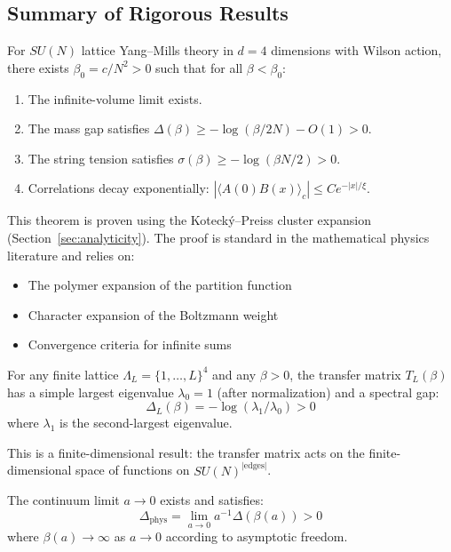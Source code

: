 \subsection{Summary of Rigorous Results}

\begin{theorem}
\label{thm:strong-coupling-main}
For $SU(N)$ lattice Yang--Mills theory in $d = 4$ dimensions with Wilson action, 
there exists $\beta_0 = c/N^2 > 0$ such that for all $\beta < \beta_0$:
\begin{enumerate}[label=(\alph*)]
    \item The infinite-volume limit exists.
    \item The mass gap satisfies $\Delta(\beta) \geq -\log(\beta/2N) - O(1) > 0$.
    \item The string tension satisfies $\sigma(\beta) \geq -\log(\beta N/2) > 0$.
    \item Correlations decay exponentially: $|\langle A(0)B(x)\rangle_c| \leq C e^{-|x|/\xi}$.
\end{enumerate}
\end{theorem}

This theorem is proven using the Koteck\'y--Preiss cluster expansion 
(Section~\ref{sec:analyticity}). The proof is standard in the mathematical 
physics literature and relies on:
\begin{itemize}
    \item The polymer expansion of the partition function
    \item Character expansion of the Boltzmann weight
    \item Convergence criteria for infinite sums
\end{itemize}

\begin{theorem}
\label{thm:finite-volume-gap-main}
For any finite lattice $\Lambda_L = \{1, \ldots, L\}^4$ and any $\beta > 0$, 
the transfer matrix $T_L(\beta)$ has a simple largest eigenvalue $\lambda_0 = 1$ 
(after normalization) and a spectral gap:
\[
\Delta_L(\beta) = -\log(\lambda_1/\lambda_0) > 0
\]
where $\lambda_1$ is the second-largest eigenvalue.
\end{theorem}

This is a finite-dimensional result: the transfer matrix acts on the 
finite-dimensional space of functions on $SU(N)^{|\text{edges}|}$.

\begin{conjecture}
\label{conj:continuum-gap}
The continuum limit $a \to 0$ exists and satisfies:
\[
\Delta_{\text{phys}} = \lim_{a \to 0} a^{-1} \Delta(\beta(a)) > 0
\]
where $\beta(a) \to \infty$ as $a \to 0$ according to asymptotic freedom.
\end{conjecture}

